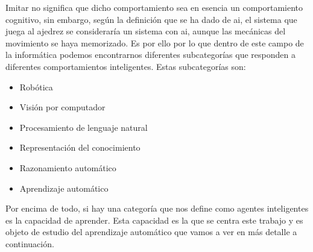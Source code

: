 Imitar no significa que dicho comportamiento sea en esencia un comportamiento cognitivo, sin embargo, según la definición que se ha dado de \acrshort{ai}, el sistema que juega al ajedrez se consideraría un sistema con \acrshort{ai}, aunque las mecánicas del movimiento se haya memorizado. Es por ello por lo que dentro de este campo de la informática podemos encontrarnos diferentes subcategorías que responden a diferentes comportamientos inteligentes. Estas subcategorías son:
\begin{itemize}
\item Robótica
\item Visión por computador
\item Procesamiento de lenguaje natural 
\item Representación del conocimiento
\item Razonamiento automático
\item Aprendizaje automático
\end{itemize}

Por encima de todo, si hay una categoría que nos define como agentes inteligentes es la capacidad de aprender. Esta capacidad es la que se centra este trabajo y es objeto de estudio del aprendizaje automático que vamos a ver en más detalle a continuación.
\newline